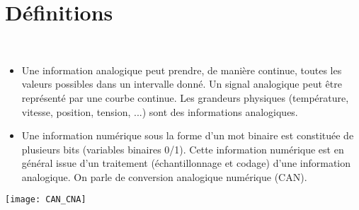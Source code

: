 \fichetrue
\proftrue
\tdfalse
\coursfalse



\def\xxnumchapitre{Révisions 1 \vspace{.2cm}}
\def\xxchapitre{\hspace{.12cm} Définitions préliminaires et détermination des performances}
\def\xxYCartouche{-2.25cm}
\def\xxposongletx{2}
\def\xxposonglettext{1.45}
\def\xxposonglety{19}%

\def\xxonglet{Cy 01 -- Rév 1}

\def\xxactivite{Fiche}


\def\xxpied{%
Cycle 01 -- Modéliser le comportement des systèmes multiphysiques\\
Révision 1 -- \xxactivite%
}

\setcounter{secnumdepth}{5}

\iflivret

\else

\fi
\vspace{.5cm}
\pagestyle{fancy}
\thispagestyle{plain}
\setcounter{section}{0}

\section{Définitions}



\begin{defi} ~\\
\begin{itemize}[label=,font=\color{ocre}] 
\item Une information analogique peut prendre, de manière continue, toutes les valeurs
possibles dans un intervalle donné. Un signal analogique peut être représenté
par une courbe continue. Les grandeurs physiques (température, vitesse,
position, tension, ...) sont des informations analogiques.

\item Une information numérique sous la forme d'un mot binaire est constituée de
plusieurs bits (variables binaires 0/1). Cette information numérique est en
général issue d'un traitement (échantillonnage et codage) d'une information
analogique. On parle de conversion analogique numérique (CAN).
\end{itemize}
\end{defi}

\begin{center}
\texttt{[image: CAN\_CNA]}

\end{center}



